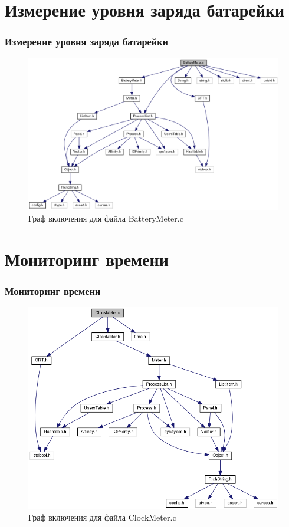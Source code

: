 \documentclass{beamer}
\begin{document}
\section{Измерение уровня заряда батарейки}

\begin{frame}
\frametitle{Измерение уровня заряда батарейки}

\begin{figure}
\includegraphics[scale=0.3]{res/battery_meter.png}
\caption{Граф включения для файла BatteryMeter.c}
\end{figure}

\end{frame}
\section{Мониторинг времени}

\begin{frame}
\frametitle{Мониторинг времени}

\begin{figure}
\includegraphics[scale=0.35]{res/clock_meter.png}
\caption{Граф включения для файла ClockMeter.c}
\end{figure}

\end{frame}
\end{document}
